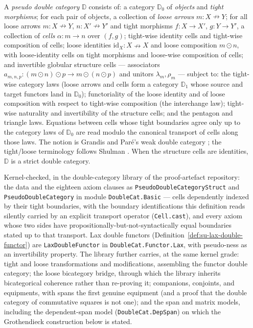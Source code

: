\begin{definition}
\label{def:su-pseudo-double-category}
A \emph{pseudo double category} $\mathbb{D}$ consists of: a category
$\mathbb{D}_0$ of \emph{objects} and \emph{tight morphisms}; for each
pair of objects, a collection of \emph{loose arrows}
$m \colon X \nrightarrow Y$; for all loose arrows
$m \colon X \nrightarrow Y$, $n \colon X' \nrightarrow Y'$ and tight
morphisms $f \colon X \to X'$, $g \colon Y \to Y'$, a collection of
\emph{cells} $\alpha \colon m \to n$ over $(f, g)$; tight-wise
identity cells and tight-wise composition of cells; loose identities
$\mathrm{id}_X \colon X \nrightarrow X$ and loose composition
$m \odot n$, with loose-identity cells on tight morphisms and
loose-wise composition of cells; and invertible globular structure
cells --- associators $a_{m,n,p} \colon (m \odot n) \odot p \to
m \odot (n \odot p)$ and unitors $\lambda_m, \rho_m$ --- subject to:
the tight-wise category laws (loose arrows and cells form a category
$\mathbb{D}_1$ whose source and target functors land in
$\mathbb{D}_0$); functoriality of the loose identity and of loose
composition with respect to tight-wise composition (the interchange
law); tight-wise naturality and invertibility of the structure
cells; and the pentagon and triangle laws. Equations between cells
whose tight boundaries agree only up to the category laws of
$\mathbb{D}_0$ are read modulo the canonical transport of cells
along those laws. The notion is Grandis and Par\'e's weak double
category \cite{grandis99, grandis04}; the tight/loose terminology
follows Shulman \cite{shulman08}.
When the structure cells are identities, $\mathbb{D}$ is a strict
double category.
\end{definition}

\begin{remark}
\label{rem:su-pdc-mechanized}
Kernel-checked, in the double-category library of the proof-artefact
repository: the data and the eighteen axiom clauses as
\texttt{PseudoDoubleCategoryStruct} and
\texttt{PseudoDoubleCategory} in module \texttt{DoubleCat.Basic} ---
cells dependently indexed by their tight boundaries, with the
boundary identifications this definition reads silently carried by
an explicit transport operator (\texttt{Cell.cast}), and every axiom
whose two sides have propositionally-but-not-syntactically equal
boundaries stated up to that transport. Lax double functors
(Definition~\ref{def:su-lax-double-functor}) are
\texttt{LaxDoubleFunctor} in \texttt{DoubleCat.Functor.Lax}, with
pseudo-ness as an invertibility property. The library further
carries, at the same kernel grade: tight and loose transformations
and modifications, assembling the functor double category; the loose
bicategory bridge, through which the library inherits bicategorical
coherence rather than re-proving it; companions, conjoints, and
equipments, with spans the first genuine equipment (and a proof that
the double category of commutative squares is not one); and the span
and matrix models, including the dependent-span model
(\texttt{DoubleCat.DepSpan}) on which the Grothendieck construction
below is stated.
\end{remark}

